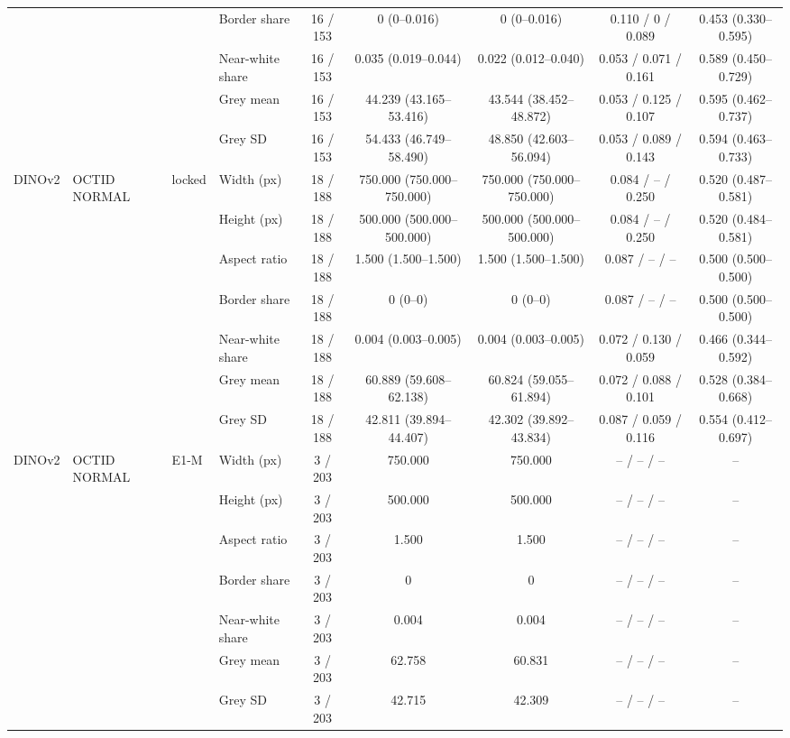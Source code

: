 \begin{longtable}{@{}llllccccc@{}}
 &  &  & Border share & 16 / 153 & 0 (0--0.016) & 0 (0--0.016) & 0.110 / 0 / 0.089 & 0.453 (0.330--0.595) \\
 &  &  & Near-white share & 16 / 153 & 0.035 (0.019--0.044) & 0.022 (0.012--0.040) & 0.053 / 0.071 / 0.161 & 0.589 (0.450--0.729) \\
 &  &  & Grey mean & 16 / 153 & 44.239 (43.165--53.416) & 43.544 (38.452--48.872) & 0.053 / 0.125 / 0.107 & 0.595 (0.462--0.737) \\
 &  &  & Grey SD & 16 / 153 & 54.433 (46.749--58.490) & 48.850 (42.603--56.094) & 0.053 / 0.089 / 0.143 & 0.594 (0.463--0.733) \\
\addlinespace[1pt]
DINOv2 & OCTID NORMAL & locked & Width (px) & 18 / 188 & 750.000 (750.000--750.000) & 750.000 (750.000--750.000) & 0.084 / -- / 0.250 & 0.520 (0.487--0.581) \\
 &  &  & Height (px) & 18 / 188 & 500.000 (500.000--500.000) & 500.000 (500.000--500.000) & 0.084 / -- / 0.250 & 0.520 (0.484--0.581) \\
 &  &  & Aspect ratio & 18 / 188 & 1.500 (1.500--1.500) & 1.500 (1.500--1.500) & 0.087 / -- / -- & 0.500 (0.500--0.500) \\
 &  &  & Border share & 18 / 188 & 0 (0--0) & 0 (0--0) & 0.087 / -- / -- & 0.500 (0.500--0.500) \\
 &  &  & Near-white share & 18 / 188 & 0.004 (0.003--0.005) & 0.004 (0.003--0.005) & 0.072 / 0.130 / 0.059 & 0.466 (0.344--0.592) \\
 &  &  & Grey mean & 18 / 188 & 60.889 (59.608--62.138) & 60.824 (59.055--61.894) & 0.072 / 0.088 / 0.101 & 0.528 (0.384--0.668) \\
 &  &  & Grey SD & 18 / 188 & 42.811 (39.894--44.407) & 42.302 (39.892--43.834) & 0.087 / 0.059 / 0.116 & 0.554 (0.412--0.697) \\
\addlinespace[1pt]
DINOv2 & OCTID NORMAL & E1-M & Width (px) & 3 / 203 & 750.000 & 750.000 & -- / -- / -- & -- \\
 &  &  & Height (px) & 3 / 203 & 500.000 & 500.000 & -- / -- / -- & -- \\
 &  &  & Aspect ratio & 3 / 203 & 1.500 & 1.500 & -- / -- / -- & -- \\
 &  &  & Border share & 3 / 203 & 0 & 0 & -- / -- / -- & -- \\
 &  &  & Near-white share & 3 / 203 & 0.004 & 0.004 & -- / -- / -- & -- \\
 &  &  & Grey mean & 3 / 203 & 62.758 & 60.831 & -- / -- / -- & -- \\
 &  &  & Grey SD & 3 / 203 & 42.715 & 42.309 & -- / -- / -- & -- \\

\end{longtable}
